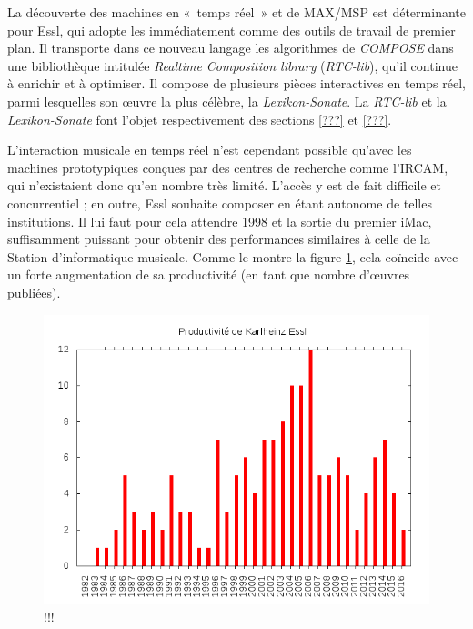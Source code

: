 \documentclass[a4paper,12pt]{article}
\newcommand{\guill}[1]{«~#1~»}
\begin{document}
La découverte des machines en \guill{temps réel} et de MAX/MSP est déterminante pour Essl, qui adopte les immédiatement comme des outils de travail de premier plan. Il transporte dans ce nouveau langage les algorithmes de \emph{COMPOSE} dans une bibliothèque intitulée \emph{Realtime Composition library} (\emph{RTC-lib}), qu'il continue à enrichir et à optimiser. Il compose de plusieurs pièces interactives en temps réel, parmi lesquelles son œuvre la plus célèbre, la \emph{Lexikon-Sonate}. La \emph{RTC-lib} et la \emph{Lexikon-Sonate} font l'objet respectivement des sections \ref{???} et \ref{???}.

L'interaction musicale en temps réel n'est cependant possible qu'avec les machines prototypiques conçues par des centres de recherche comme l'IRCAM, qui n'existaient donc qu'en nombre très limité. L'accès y est de fait difficile et concurrentiel ; en outre, Essl souhaite composer en étant autonome de telles institutions. Il lui faut pour cela attendre 1998 et la sortie du premier iMac, suffisamment puissant pour obtenir des performances similaires à celle de la Station d'informatique musicale. Comme le montre la figure \ref{productivite}, cela coïncide avec un forte augmentation de sa productivité (en tant que nombre d'œuvres publiées).

\begin{figure}[h!]
\begin{center}
\includegraphics[width=12cm]{../Divers/plots/NumberOfWorks.png}
\caption{!!!}
\end{center}
\label{productivite}
\end{figure}
\end{document}
